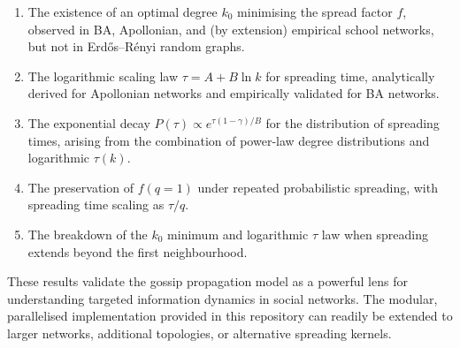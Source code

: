 \documentclass[9pt,a4paper,twocolumn,twoside]{tau-class/tau}
\begin{document}
\begin{enumerate}
    \item The existence of an optimal degree $k_0$ minimising the spread factor $f$, observed in BA, Apollonian, and (by extension) empirical school networks, but not in Erd\H{o}s--R\'enyi random graphs.
    \item The logarithmic scaling law $\tau = A + B\ln k$ for spreading time, analytically derived for Apollonian networks and empirically validated for BA networks.
    \item The exponential decay $P(\tau) \propto e^{\tau(1-\gamma)/B}$ for the distribution of spreading times, arising from the combination of power-law degree distributions and logarithmic $\tau(k)$.
    \item The preservation of $f(q=1)$ under repeated probabilistic spreading, with spreading time scaling as $\tau/q$.
    \item The breakdown of the $k_0$ minimum and logarithmic $\tau$ law when spreading extends beyond the first neighbourhood.
\end{enumerate}

These results validate the gossip propagation model as a powerful lens for understanding targeted information dynamics in social networks. The modular, parallelised implementation provided in this repository can readily be extended to larger networks, additional topologies, or alternative spreading kernels.


\printbibliography
\end{document}
